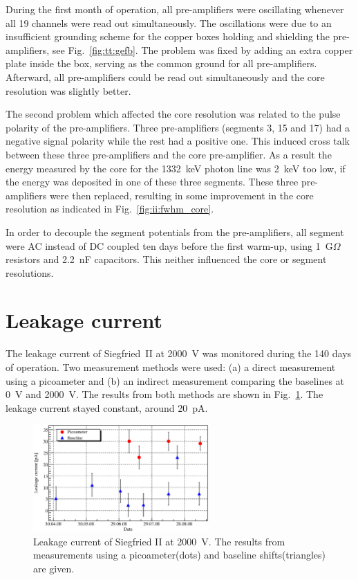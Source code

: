 During the first month of operation, all pre-amplifiers were oscillating whenever all 19 channels were read out simultaneously. The oscillations were due to an insufficient grounding scheme for the copper boxes holding and shielding the pre-amplifiers, see Fig.~\ref{fig:tt:gefb}. The problem was fixed by adding an extra copper plate inside the box, serving as the common ground for all pre-amplifiers. Afterward, all pre-amplifiers could be read out simultaneously and the core resolution was slightly better.

The second problem which affected the core resolution was related to the pulse polarity of the pre-amplifiers. Three pre-amplifiers (segments 3, 15 and 17) had a negative signal polarity while the rest had a positive one. This induced cross talk between these three pre-amplifiers and the core pre-amplifier. 
As a result the energy measured by the core for the 1332~keV photon line was 2~keV too low, if the energy was deposited in one of these three segments. These three pre-amplifiers were then replaced, resulting in some improvement in the core resolution as indicated in Fig.~\ref{fig:ii:fwhm_core}.

In order to decouple the segment potentials from the pre-amplifiers, all segment were AC instead of DC coupled ten days before the first warm-up, using 1~G$\Omega$ resistors and 2.2~nF capacitors. This neither influenced the core or segment resolutions.


\section{Leakage current}
\label{sec:ii:current}
The leakage current of Siegfried~II at 2000~V was monitored during the 140 days of operation. Two measurement methods were used: (a) a direct measurement using a picoameter and (b) an indirect measurement comparing the baselines at 0~V and 2000~V. The results from both methods are shown in Fig.~\ref{fig:ii:lc}. The leakage current stayed constant, around 20~pA.

\begin{figure}[htbp]
\centering
\includegraphics[width=0.6\textwidth, clip]{LC}
\caption{Leakage current of Siegfried II at 2000~V. The results from measurements using a picoameter(dots) and baseline shifts(triangles) are given.}
\label{fig:ii:lc}
\end{figure}

